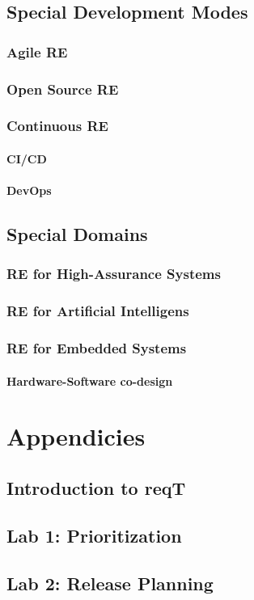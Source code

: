 \documentclass{reqengbook}
\begin{document}
\chapter{Special Development Modes}

\section{Agile RE}

\section{Open Source RE}

\section{Continuous RE}

\subsection{CI/CD}
\subsection{DevOps}

\chapter{Special Domains}

\section{RE for High-Assurance Systems}

\section{RE for Artificial Intelligens}

\section{RE for Embedded Systems}
\subsection{Hardware-Software co-design}

\part{Appendicies}\appendix

\chapter{Introduction to reqT}

\chapter{Lab 1: Prioritization}

\chapter{Lab 2: Release Planning}
\end{document}

